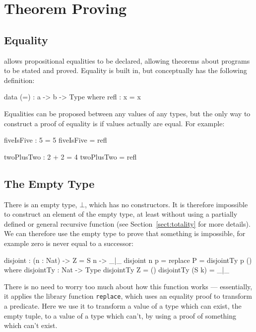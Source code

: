 \section{Theorem Proving}

\subsection{Equality}

\Idris{} allows propositional equalities to be declared, allowing theorems about
programs to be stated and proved.
Equality is built in, but conceptually has the following definition:

\begin{code}
data (=) : a -> b -> Type where
   refl : x = x
\end{code}

\noindent
Equalities can be proposed between any values of any types, but the only way to construct a proof of equality is if values actually are equal.
For example:

\begin{code}
fiveIsFive : 5 = 5
fiveIsFive = refl

twoPlusTwo : 2 + 2 = 4
twoPlusTwo = refl
\end{code}

\subsection{The Empty Type}

\label{sect:empty}

There is an empty type, $\bot$, which has no constructors.
It is therefore impossible to construct an element of the empty type, at least without using a partially defined or general recursive function (see Section~\ref{sect:totality} for more details).
We can therefore use the empty type to prove that something is impossible, for example zero is never equal to a successor:

\begin{code}
disjoint : (n : Nat) -> Z = S n -> _|_
disjoint n p = replace {P = disjointTy} p ()
  where
    disjointTy : Nat -> Type
    disjointTy Z = ()
    disjointTy (S k) = _|_
\end{code} 

\noindent
There is no need to worry too much about how this function works --- essentially, it applies the library function \texttt{replace}, which uses an equality proof to  transform a predicate.
Here we use it to transform a value of a type which can exist, the empty tuple, to a value of a type which can't, by using a proof of something which can't exist.

